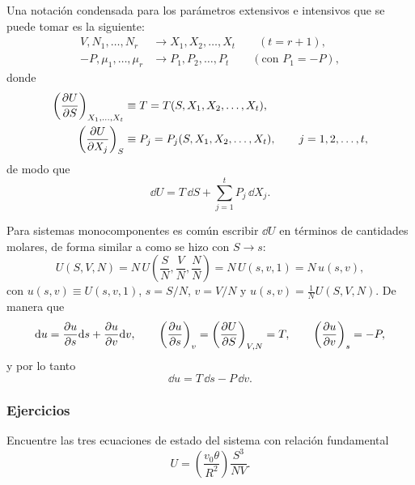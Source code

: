 Una notación condensada para los parámetros extensivos e intensivos que se puede tomar es la
siguiente:
\begin{align*}
  V,N_1,\dots,N_r&\longrightarrow X_1,X_2,\dots,X_t\qquad(t=r+1),\\
  -P,\mu_1,\dots,\mu_r&\longrightarrow P_1,P_2,\dots,P_t\qquad(\text{con }P_1=-P),
\end{align*}
donde
\begin{align*}
  \left(\frac{\partial U}{\partial S}\right)_{X_1,\dots,X_t}&\equiv T=T(S,X_1,X_2,\dots,X_t),\\
  \left(\frac{\partial U}{\partial X_j}\right)_{S}&\equiv P_j=P_j(S,X_1,X_2,\dots,X_t),\qquad j=1,2,\dots,t,
\end{align*}
de modo que
\begin{equation*}
  \dd U=T\,\dd S+\sum_{j=1}^{t}P_j\,\dd X_j.
\end{equation*}

Para sistemas monocomponentes es común escribir $\dd U$ en términos de cantidades molares, de forma
similar a como se hizo con $S\to s$:
\begin{equation*}
  U(S,V,N)=N\,U\!\left(\frac{S}{N},\frac{V}{N},\frac{N}{N}\right)=N\,U(s,v,1)=N\,u(s,v),
\end{equation*}
con $u(s,v)\equiv U(s,v,1)$, $s=S/N$, $v=V/N$ y $u(s,v)=\frac{1}{N}U(S,V,N)$. De manera que
\begin{equation*}
  \dd u=\pdv{u}{s}\dd s+\pdv{u}{v}\dd v,\qquad
  \left(\frac{\partial u}{\partial s}\right)_{v}=\left(\frac{\partial U}{\partial S}\right)_{V,N}=T,\qquad
  \left(\frac{\partial u}{\partial v}\right)_{s}=-P,
\end{equation*}
y por lo tanto
\begin{equation*}
  \dd u=T\,\dd s-P\,\dd v.
\end{equation*}

\subsubsection*{Ejercicios}

\begin{ejercicio}
  Encuentre las tres ecuaciones de estado del sistema con relación fundamental
  \begin{equation*}
    U=\left(\frac{v_0\theta}{R^{2}}\right)\frac{S^{3}}{NV}.
  \end{equation*}
\end{ejercicio}


